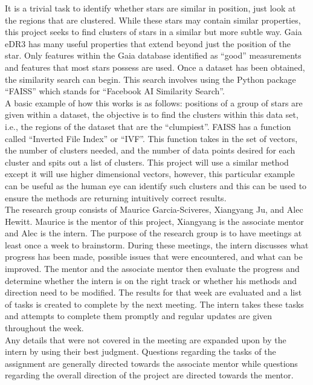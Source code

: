 \documentclass[12pt]{amsart}
\begin{document}
\indent It is a trivial task to identify whether stars are similar in position, just look at the regions that are clustered.
While these stars may contain similar properties, this project seeks to find clusters of stars in a
similar but more subtle way. Gaia eDR3 has many useful properties that extend beyond just the
position of the star. Only features within the Gaia database identified as “good” measurements
and features that most stars possess are used. Once a dataset has been obtained, the similarity
search can begin. This search involves using the Python package “FAISS” which stands for
“Facebook AI Similarity Search”.\\

\indent A basic example of how this works is as follows: positions of a group of stars are given
within a dataset, the objective is to find the clusters within this data set, i.e., the regions of the
dataset that are the “clumpiest”. FAISS has a function called “Inverted File Index” or “IVF”. This
function takes in the set of vectors, the number of clusters needed, and the number of data points
desired for each cluster and spits out a list of clusters. This project will use a similar method except it will use higher dimensional vectors, however, this particular example can be useful as the
human eye can identify such clusters and this can be used to ensure the methods are returning
intuitively correct results.\\

\indent The research group consists of Maurice Garcia-Sciveres, Xiangyang Ju, and Alec Hewitt.
Maurice is the mentor of this project, Xiangyang is the associate mentor and Alec is the intern.
The purpose of the research group is to have meetings at least once a week to brainstorm. During
these meetings, the intern discusses what progress has been made, possible issues that were encountered, and what can be improved. The mentor and the associate mentor then evaluate the
progress and determine whether the intern is on the right track or whether his methods and direction need to be modified. The results for that week are evaluated and a list of tasks is created to
complete by the next meeting. The intern takes these tasks and attempts to complete them
promptly and regular updates are given throughout the week.\\

\indent Any details that were not covered in the meeting are expanded upon by the intern by using their best judgment. Questions regarding the tasks of the assignment are generally directed
towards the associate mentor while questions regarding the overall direction of the project are
directed towards the mentor.\\
\end{document}
